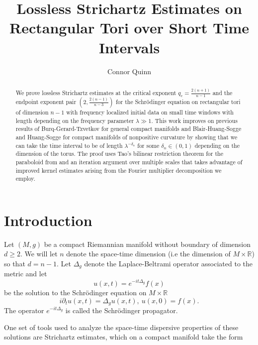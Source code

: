 \documentclass[11pt]{amsart}
\numberwithin{equation}{section}
\newcommand{\R}[1][]{\mathbb{R}^#1}
\newcommand{\laplac}[1]{\Delta_{#1}}
\begin{document}
\title{Lossless Strichartz Estimates on Rectangular Tori over Short Time Intervals}
\author{Connor Quinn}

\begin{abstract}
    We prove lossless Strichartz estimates at the critical exponent $q_c = \frac{2(n+1)}{n-1}$ and the endpoint exponent pair $\left(2,\frac{2(n-1)}{n-3}\right)$ for the Schr\"{o}dinger equation on rectangular tori of dimension $n-1$ with frequency localized initial data on small time windows with length depending on the frequency parameter $\lambda \gg 1$. This work improves on previous results of Burq-Gerard-Tzvetkov \cite{bgtstrichartzmanifold} for general compact manifolds and Blair-Huang-Sogge \cite{BlairHuangSoggeStrichartz} and Huang-Sogge \cite{HuangSoggeStrichartz} for compact manifolds of nonpositive curvature by showing that we can take the time interval to be of length $\lambda^{-\delta_n}$ for some $\delta_n \in (0,1)$ depending on the dimension of the torus. The proof uses Tao’s bilinear restriction theorem for the paraboloid from \cite{taobilinear} and an iteration argument over multiple scales that takes advantage of improved kernel estimates arising from the Fourier multiplier decomposition we employ.
\end{abstract}
\maketitle

\section{Introduction}
Let $(M,g)$ be a compact Riemannian manifold without boundary of dimension $d \geq 2$. We will let $n$ denote the space-time dimension (i.e the dimension of $M \times \mathbb{R}$) so that $d = n-1$. Let $\laplac{g}$ denote the Laplace-Beltrami operator associated to the metric and let
\begin{equation}
    u(x,t) = e^{-it\laplac{g}}f(x)
\end{equation}
be the solution to the Schr\"{o}dinger equation on $M \times \R{}$
\begin{equation} \label{schrodinger equation}
    i\partial_{t} u(x,t) = \laplac{g}u(x,t), \ u(x,0) = f(x).
\end{equation}
The operator $e^{-it\laplac{g}}$ is called the Schr\"{o}dinger propagator. 

One set of tools used to analyze the space-time dispersive properties of these solutions are Strichartz estimates, which on a compact manifold take the form
\end{document}
